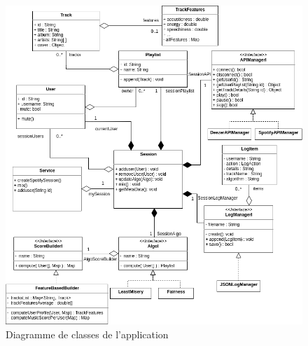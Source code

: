 \documentclass{article}
\begin{document}
		\newpage
		\begin{figure}[h!]
			\includegraphics[width=\linewidth]{ressources/diagramme_classes.png}
			\caption{Diagramme de classes de l'application}
		\end{figure}
		
		\newpage
		
\end{document}
